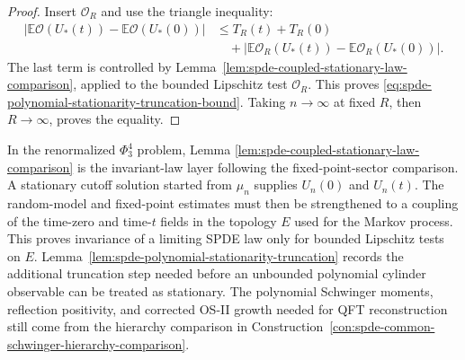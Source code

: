 \begin{proof}
Insert \(\mathcal O_R\) and use the triangle inequality:
\[
\begin{aligned}
  \left|
    \mathbb E\mathcal O(U_\ast(t))
    -\mathbb E\mathcal O(U_\ast(0))
  \right|
  &\leq
  T_R(t)+T_R(0) \\
  &\quad+
  \left|
    \mathbb E\mathcal O_R(U_\ast(t))
    -\mathbb E\mathcal O_R(U_\ast(0))
  \right|.
\end{aligned}
\]
The last term is controlled by
Lemma~\ref{lem:spde-coupled-stationary-law-comparison}, applied to the
bounded Lipschitz test \(\mathcal O_R\).  This proves
\eqref{eq:spde-polynomial-stationarity-truncation-bound}.  Taking \(n\to\infty\)
at fixed \(R\), then \(R\to\infty\), proves the equality.
\end{proof}

In the renormalized \(\Phi^4_3\) problem, Lemma
\ref{lem:spde-coupled-stationary-law-comparison} is the invariant-law layer
following the fixed-point-sector comparison.  A stationary cutoff solution
started from \(\mu_n\) supplies \(U_n(0)\) and \(U_n(t)\).  The random-model
and fixed-point estimates must then be strengthened to a coupling of the
time-zero and time-\(t\) fields in the topology \(E\) used for the Markov
process.  This proves invariance of a limiting SPDE law only for bounded
Lipschitz tests on \(E\).  Lemma~\ref{lem:spde-polynomial-stationarity-truncation}
records the additional truncation step needed before an unbounded polynomial
cylinder observable can be treated as stationary.  The polynomial Schwinger
moments, reflection positivity, and corrected OS-II growth needed for QFT
reconstruction still come from the hierarchy comparison in
Construction~\ref{con:spde-common-schwinger-hierarchy-comparison}.

